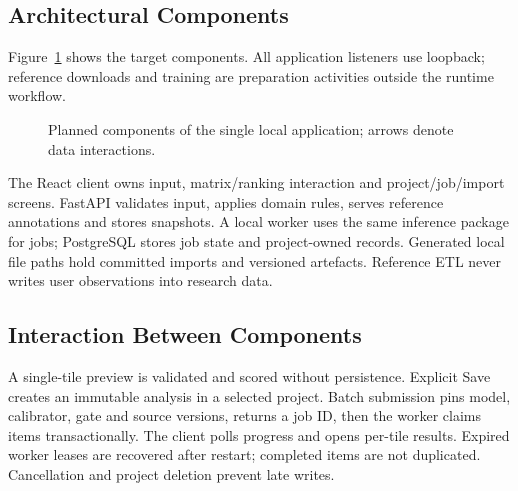 \subsection{Architectural Components}
Figure~\ref{fig:local-architecture} shows the target components. All application listeners use loopback;
reference downloads and training are preparation activities outside the runtime workflow.
\begin{figure}[htbp]
  \centering
  \caption{Planned components of the single local application; arrows denote data interactions.}
  \label{fig:local-architecture}
\end{figure}

The React client owns input, matrix/ranking interaction and project/job/import screens. FastAPI
validates input, applies domain rules, serves reference annotations and stores snapshots. A local
worker uses the same inference package for jobs; PostgreSQL stores job state and project-owned
records. Generated local file paths hold committed imports and versioned artefacts. Reference ETL
never writes user observations into research data.

\subsection{Interaction Between Components}
A single-tile preview is validated and scored without persistence. Explicit Save creates an immutable
analysis in a selected project. Batch submission pins model, calibrator, gate and source versions,
returns a job ID, then the worker claims items transactionally. The client polls progress and opens
per-tile results. Expired worker leases are recovered after restart; completed items are not duplicated.
Cancellation and project deletion prevent late writes.

